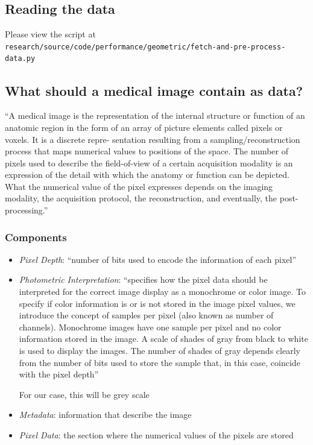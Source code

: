 \documentclass[11pt]{article}
\begin{document}
\subsection{Reading the data}

Please view the script at \texttt{research/source/code/performance/geometric/fetch-and-pre-process-data.py}

\subsection{What should a medical image contain as data?}

``A medical image is the representation of the internal structure
or function of an anatomic region in the form of an array of
picture elements called pixels or voxels. It is a discrete repre-
sentation resulting from a sampling/reconstruction process
that maps numerical values to positions of the space. The
number of pixels used to describe the field-of-view of a certain
acquisition modality is an expression of the detail with which
the anatomy or function can be depicted. What the numerical
value of the pixel expresses depends on the imaging modality,
the acquisition protocol, the reconstruction, and eventually,
the post-processing.'' \cite{file-formats}

\subsubsection{Components}

\begin{itemize}
    \item \textit{Pixel Depth}: ``number of bits used to encode the information of each pixel'' \cite{file-formats}
    \item \textit{Photometric Interpretation}:  ``specifies how the pixel data
    should be interpreted for the correct image display as a 
    monochrome or color image. To specify if color information is or is
    not stored in the image pixel values, we introduce the concept
    of samples per pixel (also known as number of channels).
    Monochrome images have one sample per pixel and no color
    information stored in the image. A scale of shades of gray
    from black to white is used to display the images. The number
    of shades of gray depends clearly from the number of bits used
    to store the sample that, in this case, coincide with the pixel
    depth'' \cite{file-formats}

    For our case, this will be grey scale 

    \item \textit{Metadata}: information that describe the image
    \item \textit{Pixel Data}: the section where the numerical values of the pixels are stored
\end{itemize}
\end{document}
